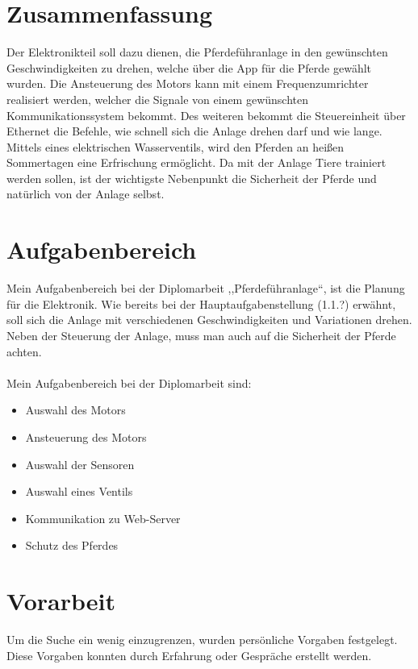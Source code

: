 \documentclass[12pt]{scrreprt} %
\begin{document}
\section{Zusammenfassung}
\label{sec:zusammenfassung}

Der Elektronikteil soll dazu dienen, die Pferdeführanlage in den gewünschten Geschwindigkeiten zu drehen, welche über die App für die Pferde gewählt wurden. 
Die Ansteuerung des Motors kann mit einem Frequenzumrichter realisiert werden, 
welcher die Signale von einem gewünschten Kommunikationssystem bekommt.
Des weiteren bekommt die Steuereinheit über Ethernet die Befehle, wie schnell sich die Anlage drehen darf und wie lange. 
Mittels eines elektrischen Wasserventils, wird den Pferden an heißen Sommertagen eine Erfrischung ermöglicht. 
Da mit der Anlage Tiere trainiert werden sollen, ist der wichtigste Nebenpunkt die Sicherheit der Pferde und natürlich von der Anlage selbst.
\newpage

\section{Aufgabenbereich}
\label{sec:aufgabenbereich}

Mein Aufgabenbereich bei der Diplomarbeit ,,Pferdeführanlage“, ist die Planung für die Elektronik. Wie bereits bei der Hauptaufgabenstellung (1.1.?) erwähnt, 
soll sich die Anlage mit verschiedenen Geschwindigkeiten und Variationen drehen.  Neben der Steuerung der Anlage, muss man auch auf die Sicherheit der Pferde achten.
\\
\\
Mein Aufgabenbereich bei der Diplomarbeit sind:

\begin{itemize}
\item Auswahl des Motors
\item Ansteuerung des Motors
\item Auswahl der Sensoren
\item Auswahl eines Ventils
\item Kommunikation zu Web-Server
\item Schutz des Pferdes
\end{itemize}
\newpage
\section{Vorarbeit}
\label{sec:vorarbeit}

Um die Suche ein wenig einzugrenzen, wurden persönliche Vorgaben festgelegt.
Diese Vorgaben konnten durch Erfahrung oder Gespräche erstellt werden.
\end{document}
